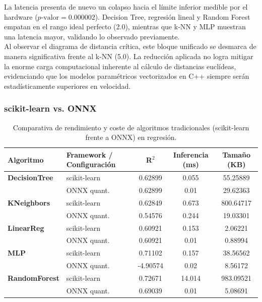\documentclass[a4paper,12pt,twoside,final]{book}
\begin{document}
\newpage
La latencia presenta de nuevo un colapso hacia el límite inferior medible por el hardware ($p\text{-valor} = 0.000002$).
Decision Tree, regresión lineal y Random Forest empatan en el rango ideal perfecto (2.0), mientras que k-NN y MLP muestran
una latencia mayor, validando lo observado previamente.\\

Al observar el diagrama de distancia crítica, este bloque unificado se desmarca de manera significativa frente al k-NN
(5.0). La reducción aplicada no logra mitigar la enorme carga computacional inherente al cálculo de distancias euclídeas,
evidenciando que los modelos paramétricos vectorizados en C++ siempre serán estadísticamente superiores en velocidad.

\subsubsection{scikit-learn vs. ONNX}
\begin{table}[htbp]
  \centering
  \begin{tabularx}{\textwidth}{lXccc}
    \hline
    \textbf{Algoritmo} & \textbf{Framework / Configuración} & \textbf{R$^2$} & \textbf{Inferencia (ms)} & \textbf{Tamaño (KB)} \\
    \hline
    \textbf{DecisionTree} & scikit-learn & 0.62899  & 0.055  & 55.25889  \\
                          & ONNX quant.  & 0.62899  & 0.01   & 29.62363  \\
    \hline
    \textbf{KNeighbors}   & scikit-learn & 0.62849  & 0.673  & 800.64717 \\
                          & ONNX quant.  & 0.54576  & 0.244  & 19.03301  \\
    \hline
    \textbf{LinearReg}    & scikit-learn & 0.60921  & 0.153  & 2.06221   \\
                          & ONNX quant.  & 0.60921  & 0.01   & 0.88994   \\
    \hline
    \textbf{MLP}          & scikit-learn & 0.71102  & 0.157  & 38.56562  \\
                          & ONNX quant.  & -4.90574 & 0.02   & 8.56172   \\
    \hline
    \textbf{RandomForest} & scikit-learn & 0.72671  & 14.014 & 983.09521 \\
                          & ONNX quant.  & 0.69039  & 0.01   & 5.08691   \\
    \hline
  \end{tabularx}
  \caption{Comparativa de rendimiento y coste de algoritmos tradicionales (scikit-learn frente a ONNX) en regresión.}
  \label{tab:sklearn_onnx_reg_resumen}
\end{table}
\end{document}

